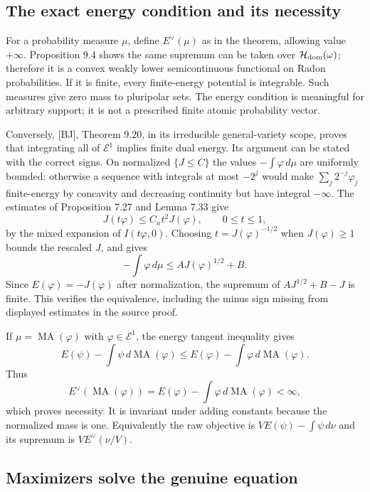 \documentclass[11pt]{article}
\begin{document}
\subsection{The exact energy condition and its
necessity}\label{the-exact-energy-condition-and-its-necessity}

For a probability measure \(\mu\), define \(E^\vee(\mu)\) as in the
theorem, allowing value \(+\infty\). Proposition 9.4 shows the same
supremum can be taken over \(\mathcal H_{\rm dom}(\omega)\); therefore
it is a convex weakly lower semicontinuous functional on Radon
probabilities. If it is finite, every finite-energy potential is
integrable. Such measures give zero mass to pluripolar sets. The energy
condition is meaningful for arbitrary support; it is not a prescribed
finite atomic probability vector.

Conversely, {[}BJ{]}, Theorem 9.20, in its irreducible general-variety
scope, proves that integrating all of \(\mathcal E^1\) implies finite
dual energy. Its argument can be stated with the correct signs. On
normalized \(\{J\leq C\}\) the values \(-\int\varphi\,d\mu\) are
uniformly bounded: otherwise a sequence with integrals at most \(-2^j\)
would make \(\sum_j2^{-j}\varphi_j\) finite-energy by concavity and
decreasing continuity but have integral \(-\infty\). The estimates of
Proposition 7.27 and Lemma 7.33 give
\[J(t\varphi)\leq C_n t^2J(\varphi),\qquad0\leq t\leq1,\] by the mixed
expansion of \(I(t\varphi,0)\). Choosing \(t=J(\varphi)^{-1/2}\) when
\(J(\varphi)\geq1\) bounds the rescaled \(J\), and gives
\[-\int\varphi\,d\mu\leq A J(\varphi)^{1/2}+B.\] Since
\(E(\varphi)=-J(\varphi)\) after normalization, the supremum of
\(AJ^{1/2}+B-J\) is finite. This verifies the equivalence, including the
minus sign missing from displayed estimates in the source proof.

If \(\mu=\operatorname{MA}(\varphi)\) with \(\varphi\in\mathcal E^1\),
the energy tangent inequality gives
\[E(\psi)-\int\psi\,d\operatorname{MA}(\varphi)
\leq E(\varphi)-\int\varphi\,d\operatorname{MA}(\varphi).\] Thus
\[E^\vee(\operatorname{MA}(\varphi))=E(\varphi)-\int\varphi\,d\operatorname{MA}(\varphi)<\infty,\]
which proves necessity. It is invariant under adding constants because
the normalized mass is one. Equivalently the raw objective is
\(VE(\psi)-\int\psi\,d\nu\) and its supremum is \(V E^\vee(\nu/V)\).

\subsection{Maximizers solve the genuine
equation}\label{maximizers-solve-the-genuine-equation}
\end{document}
